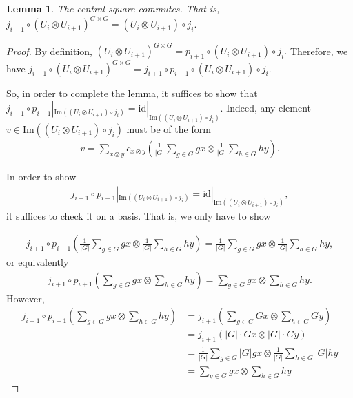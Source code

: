 \documentclass{amsart}
\newtheorem{lem}[subsubsection]{Lemma}
\newcommand{\id}{\mathrm{id}}
\newcommand\im{\text{Im}}
\begin{document}
\begin{lem}
\label{center_commutes}
 The central square commutes. That is, $j_{i+1} \circ (U_i \otimes U_{i+1})^{G\times G} = (U_i \otimes U_{i+1})\circ j_i.$
\end{lem}
\begin{proof}
By definition, $(U_i \otimes U_{i+1})^{G\times G} = p_{i+1}\circ(U_i \otimes U_{i+1})\circ j_i.$ Therefore, we have $j_{i+1} \circ (U_i \otimes U_{i+1})^{G\times G} = j_{i+1}\circ p_{i+1}\circ(U_i \otimes U_{i+1})\circ j_i.$

So, in order to complete the lemma, it suffices to show that $j_{i+1} \circ p_{i+1}|_{\im((U_i \otimes U_{i+1})\circ j_i)}= \id|_{\im((U_i \otimes U_{i+1})\circ j_i)}.$ Indeed, any element $v \in \im((U_i \otimes U_{i+1})\circ j_i)$ must be of the form 
\begin{align*}
	v=\sum_{x\otimes y}^{}c_{x\otimes y}\left(\frac{1}{|G|}\sum_{g \in G}^{} gx\otimes \frac{1}{|G|}\sum_{h\in G}^{}hy\right).
\end{align*}

In order to show 
\begin{align*}
	j_{i+1} \circ p_{i+1}|_{\im((U_i \otimes U_{i+1})\circ j_i)}= \id|_{\im((U_i \otimes U_{i+1})\circ j_i)},
\end{align*} it suffices to check it on a basis. That is, we only have to show

\begin{align*}
	j_{i+1} \circ p_{i+1}\left(\frac{1}{|G|}\sum_{g \in G}^{} gx\otimes \frac{1}{|G|}\sum_{h\in G}^{}hy\right)= \frac{1}{|G|}\sum_{g \in G}^{} gx\otimes \frac{1}{|G|}\sum_{h\in G}^{}hy,
\end{align*}  or equivalently
\begin{align*}
	j_{i+1} \circ p_{i+1}\left(\sum_{g \in G}^{} gx\otimes \sum_{h\in G}^{}hy\right)= \sum_{g \in G}^{} gx\otimes \sum_{h\in G}^{}hy.
\end{align*}
However,
\begin{align*}
	j_{i+1} \circ p_{i+1}\left(\sum_{g \in G}^{} gx\otimes \sum_{h\in G}^{}hy\right)&= j_{i+1}\left(\sum_{g \in G}^{} Gx\otimes \sum_{h\in G}^{}Gy\right)\\
	&= j_{i+1}\left(|G| \cdot Gx\otimes |G|\cdot Gy\right)\\
	&= \frac{1}{|G|} \sum_{g \in G}^{}|G|gx\otimes \frac{1}{|G|}\sum_{h\in G}^{}|G|hy\\
	&= \sum_{g \in G}^{}gx\otimes\sum_{h\in G}^{}hy
\end{align*}
\end{proof}
\end{document}
